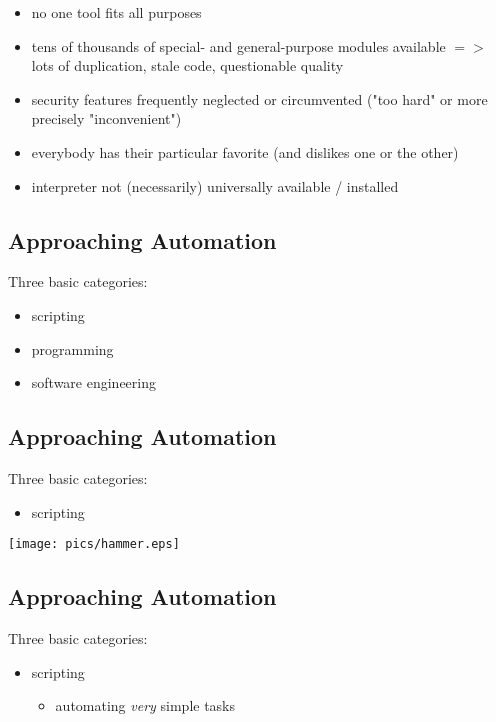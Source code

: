 \documentclass[xga]{xdvislides}
\begin{document}
\begin{itemize}
	\item no one tool fits all purposes
	\item tens of thousands of special- and general-purpose modules available $=>$
		lots of duplication, stale code, questionable quality
	\item security features frequently neglected or circumvented ("too hard" or
		more precisely "inconvenient")
	\item everybody has their particular favorite (and dislikes one or the
		other)
	\item interpreter not (necessarily) universally available / installed
\end{itemize}

\subsection{Approaching Automation}
Three basic categories:
\\

\begin{itemize}
	\item scripting
	\item programming
	\item software engineering
\end{itemize}

\subsection{Approaching Automation}
Three basic categories:
\\
\begin{itemize}
	\item scripting
\end{itemize}
\vspace*{\fill}
\begin{center}
	\texttt{[image: pics/hammer.eps]}
\end{center}
\vspace*{\fill}


\subsection{Approaching Automation}
Three basic categories:
\\

\begin{itemize}
	\item scripting
		\begin{itemize}
			\item automating {\em very} simple tasks
		\end{itemize}
\end{itemize}
\end{document}
